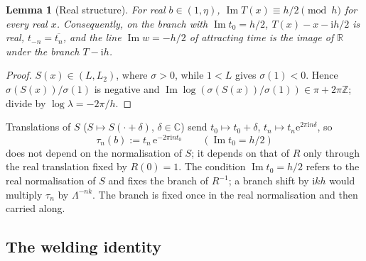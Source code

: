 \documentclass[11pt]{amsart}
\newtheorem{lemma}[theorem]{Lemma}
\theoremstyle{definition}
\newcommand{\Rr}{R}
\newcommand{\eee}{\mathrm{e}}
\newcommand{\ii}{\mathrm{i}}
\begin{document}
\begin{lemma}[Real structure]\label{lem:realT}
For real $b\in(1,\eta)$, $\operatorname{Im}T(x)\equiv h/2\pmod h$ for every
real $x$.  Consequently, on the branch with $\operatorname{Im}t_0=h/2$,
$T(x)-x-\ii h/2$ is real, $t_{-n}=\overline{t_n}$, and the line
$\operatorname{Im}w=-h/2$ of attracting time is the image of $\mathbb R$ under
the branch $T-\ii h$.
\end{lemma}

\begin{proof}
$S(x)\in(L,L_2)$, where $\sigma>0$, while $1<L$ gives $\sigma(1)<0$.  Hence
$\sigma(S(x))/\sigma(1)$ is negative and
$\operatorname{Im}\log(\sigma(S(x))/\sigma(1))\in\pi+2\pi\mathbb Z$; divide
by $\log\lambda=-2\pi/h$.
\end{proof}

Translations of $S$ ($S\mapsto S(\cdot+\delta)$, $\delta\in\mathbb C$) send
$t_0\mapsto t_0+\delta$, $t_n\mapsto t_n\eee^{2\pi\ii n\delta}$, so
\begin{equation}\label{eq:taun}
 \tau_n(b):=t_n\,\eee^{-2\pi\ii n t_0}\qquad(\operatorname{Im}t_0=h/2)
\end{equation}
does not depend on the normalisation of $S$; it depends on that of $\Rr$
only through the real translation fixed by $\Rr(0)=1$.  The condition
$\operatorname{Im}t_0=h/2$ refers to the real normalisation of $S$ and fixes the
branch of $\Rr^{-1}$; a branch shift by $\ii kh$ would multiply $\tau_n$ by
$\Lambda^{-nk}$.  The branch is fixed once in the real normalisation and then
carried along.

\subsection{The welding identity}
\end{document}
